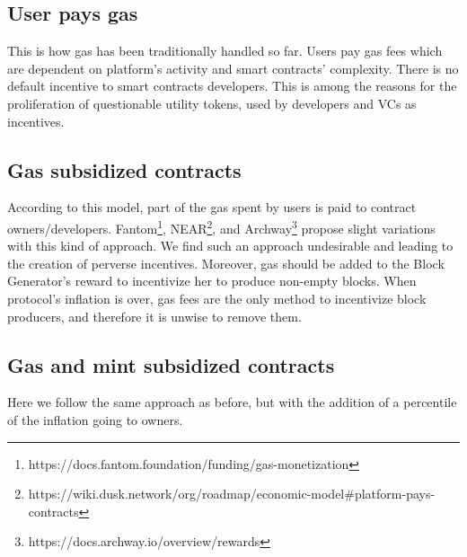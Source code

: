 \documentclass[twocolumn, nofootinbib]{revtex4-2} %
\begin{document}
    \subsection{User pays gas}\label{sec:innovative-cost-management-approach:user-pays-gas}
    This is how gas has been traditionally handled so far.
    Users pay gas fees which are dependent on platform's activity and smart
    contracts' complexity.
    There is no default incentive to smart contracts developers.
    This is among the reasons for the proliferation of questionable utility
    tokens, used by developers and VCs as incentives.

    \subsection{Gas subsidized contracts}\label{sec:innovative-cost-management-approach:gas-subsidized-contracts}
    According to this model, part of the gas spent by users is paid to contract
    owners/developers.
    Fantom\footnote{https://docs.fantom.foundation/funding/gas-monetization},
    NEAR\footnote{https://wiki.dusk.network/org/roadmap/economic-model\#platform-pays-contracts},
    and Archway\footnote{https://docs.archway.io/overview/rewards} propose slight
    variations with this kind of approach.
    We find such an approach undesirable and leading to the creation of perverse
    incentives.
    Moreover, gas should be added to the Block Generator's reward to
    incentivize her to produce non-empty blocks.
    When protocol's inflation is over, gas fees are the only method to
    incentivize block producers, and therefore it is unwise to remove them.

    \subsection{Gas and mint subsidized contracts}\label{sec:innovative-cost-management-approach:gas-and-mint-subsidized-contracts}
    Here we follow the same approach as before, but with the addition of a percentile of the inflation going to
    owners.

\end{document}

